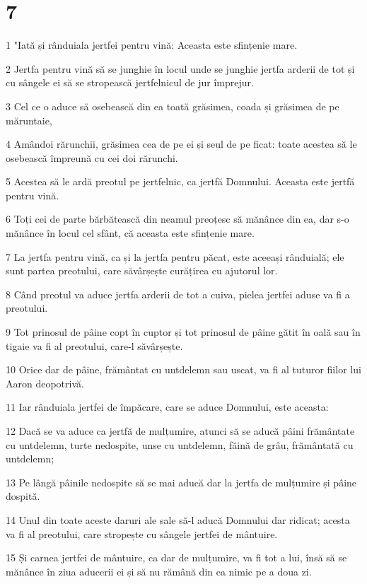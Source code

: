 \chapter{7}

\par 1 "Iată și rânduiala jertfei pentru vină: Aceasta este sfințenie mare.
\par 2 Jertfa pentru vină să se junghie în locul unde se junghie jertfa arderii de tot și cu sângele ei să se stropească jertfelnicul de jur împrejur.
\par 3 Cel ce o aduce să osebească din ea toată grăsimea, coada și grăsimea de pe măruntaie,
\par 4 Amândoi rărunchii, grăsimea cea de pe ei și seul de pe ficat: toate acestea să le osebească împreună cu cei doi rărunchi.
\par 5 Acestea să le ardă preotul pe jertfelnic, ca jertfă Domnului. Aceasta este jertfă pentru vină.
\par 6 Toți cei de parte bărbătească din neamul preoțesc să mănânce din ea, dar s-o mănânce în locul cel sfânt, că aceasta este sfințenie mare.
\par 7 La jertfa pentru vină, ca și la jertfa pentru păcat, este aceeași rânduială; ele sunt partea preotului, care săvârșește curățirea cu ajutorul lor.
\par 8 Când preotul va aduce jertfa arderii de tot a cuiva, pielea jertfei aduse va fi a preotului.
\par 9 Tot prinosul de pâine copt în cuptor și tot prinosul de pâine gătit în oală sau în tigaie va fi al preotului, care-l săvârșește.
\par 10 Orice dar de pâine, frământat cu untdelemn sau uscat, va fi al tuturor fiilor lui Aaron deopotrivă.
\par 11 Iar rânduiala jertfei de împăcare, care se aduce Domnului, este aceasta:
\par 12 Dacă se va aduce ca jertfă de mulțumire, atunci să se aducă pâini frământate cu untdelemn, turte nedospite, unse cu untdelemn, făină de grâu, frământată cu untdelemn;
\par 13 Pe lângă pâinile nedospite să se mai aducă dar la jertfa de mulțumire și pâine dospită.
\par 14 Unul din toate aceste daruri ale sale să-l aducă Domnului dar ridicat; acesta va fi al preotului, care stropește cu sângele jertfei de mântuire.
\par 15 Și carnea jertfei de mântuire, ca dar de mulțumire, va fi tot a lui, însă să se mănânce în ziua aducerii ei și să nu rămână din ea nimic pe a doua zi.
